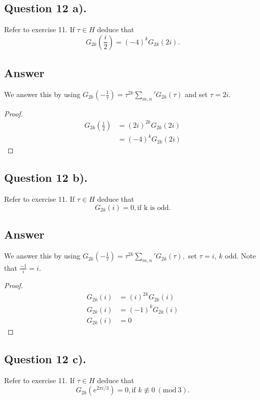 \subsection{Question 12 a).}
\noindent
Refer to exercise 11. If $\tau \in H$ deduce that
\[
    G_{2k}(\frac{i}{2}) = (-4)^{k}G_{2k}(2i).
\]

\subsection*{Answer}
\noindent
We answer this by using
$
    G_{2k}(-\frac{1}{\tau}) = \tau^{2k} \sum_{m,n}{'} G_{2k}(\tau)
$
and set $\tau = 2i$.

\begin{proof}
    \begin{align*}
        G_{2k}(\frac{i}{2}) &= (2i)^{2k} G_{2k}(2i) \\
        &= (-4)^{k} G_{2k}(2i)
    \end{align*}
\end{proof}


\subsection{Question 12 b).}
\noindent
Refer to exercise 11. If $\tau \in H$ deduce that
\[
    G_{2k}(i) =0 , \text{if k is odd.}
\]

\subsection*{Answer}
\noindent
We answer this by using
$
G_{2k}(-\frac{1}{\tau}) = \tau^{2k} \sum_{m,n}{'} G_{2k}(\tau),
$
set $\tau = i$, $k$ odd. Note that $\frac{-1}{i}=i$.

\begin{proof}
    \begin{align*}
        G_{2k}(i) &= (i)^{2k} G_{2k}(i) \\
        G_{2k}(i) &= (-1)^{k} G_{2k}(i) \\
        G_{2k}(i) &= 0
    \end{align*}
\end{proof}


\subsection{Question 12 c).}
\noindent
Refer to exercise 11. If $\tau \in H$ deduce that
\[
    G_{2k}(e^{2\pi i/3}) =0 , \text{if } k \not\equiv 0\ (\textrm{mod}\ 3).
\]

